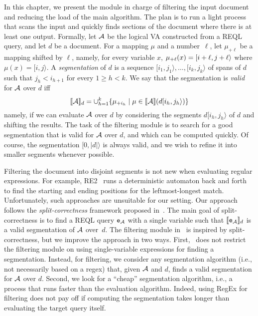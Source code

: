 
In this chapter, we present the module in charge of filtering the input document
and reducing the load of the main algorithm. The plan is to run a light process
that scans the input and quickly finds sections of the document where there is
at least one output. Formally, let $\mathcal{A}$ be the logical VA constructed from a
REQL query, and let $d$ be a document. For a mapping $\mu$ and a number~$\ell$,
let $\mu_{+\ell}$ be a mapping shifted by $\ell$, namely, for every variable
$x$, $\mu_{+\ell}(x) = [i+\ell, j+\ell\rangle$ where $\mu(x) = [i, j\rangle$. A
\emph{segmentation} of $d$ is a sequence $[i_1, j_1\rangle, \ldots, [i_k,
j_k\rangle$ of spans of $d$ such that $j_{h} < i_{h+1}$ for every $1 \geq h <
k$. We say that the segmentation is \emph{valid} for $\mathcal{A}$ over $d$ iff
$$
	\llbracket\mathcal{A}\rrbracket_{d} = \cup_{h=1}^k \{\mu_{+i_h} \mid \mu \in \llbracket\mathcal{A}\rrbracket(d[i_h, j_h\rangle) \}
$$
namely, if we can evaluate $\mathcal{A}$ over $d$ by considering the segments $d[i_h,
j_h\rangle$ of $d$ and shifting the results. The task of the filtering module is
to search for a good segmentation that is valid for $\mathcal{A}$ over $d$,
and which can be computed quickly. Of course, the segmentation $[0, |d|\rangle$
is always valid, and we wish to refine it into smaller segments whenever
possible.

Filtering the document into disjoint segments is not new when evaluating regular
expressions. For example, RE2~\citep{cox2007regular} runs a deterministic
automaton back and forth to find the starting and ending positions for the
leftmost-longest match. Unfortunately, such approaches are unsuitable for our
setting. Our approach follows the \emph{split-correctness} framework  proposed
in~\citet{DoleschalKMNN19}. The main goal of split-correctness is to find a REQL
query $\texttt{e}_{\mathcal{A}}$ with a single variable such that $\llbracket\texttt{e}_{\mathcal{A}}\rrbracket_{d}$
is a valid segmentation of $\mathcal{A}$ over~$d$. The filtering module in \rematch\ is
inspired by split-correctness, but we improve the approach in two ways. First,
\rematch\ does not restrict the filtering module on using single-variable
expressions for finding a segmentation. Instead, for filtering, we consider any
segmentation algorithm (i.e., not necessarily based on a regex) that, given
$\mathcal{A}$ and $d$, finds a valid segmentation for $\mathcal{A}$ over $d$. Second, we look
for a ``cheap'' segmentation algorithm, i.e., a process that runs faster than
the evaluation algorithm. Indeed, using RegEx for filtering does not pay off if
computing the segmentation takes longer than evaluating the target query itself.

